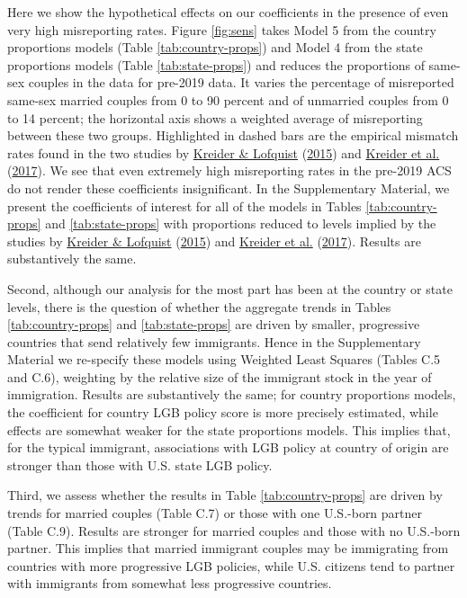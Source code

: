 \documentclass[
  12pt,
]{article}
\begin{document}
Here we show the hypothetical effects on our coefficients in the presence of even very high misreporting rates. Figure \ref{fig:sens} takes Model 5 from the country proportions models (Table \ref{tab:country-props}) and Model 4 from the state proportions models (Table \ref{tab:state-props}) and reduces the proportions of same-sex couples in the data for pre-2019 data. It varies the percentage of misreported same-sex married couples from 0 to 90 percent and of unmarried couples from 0 to 14 percent; the horizontal axis shows a weighted average of misreporting between these two groups. Highlighted in dashed bars are the empirical mismatch rates found in the two studies by \protect\hyperlink{ref-kreider_2015}{Kreider \& Lofquist} (\protect\hyperlink{ref-kreider_2015}{2015}) and \protect\hyperlink{ref-kreider_2017}{Kreider et al.} (\protect\hyperlink{ref-kreider_2017}{2017}). We see that even extremely high misreporting rates in the pre-2019 ACS do not render these coefficients insignificant. In the Supplementary Material, we present the coefficients of interest for all of the models in Tables \ref{tab:country-props} and \ref{tab:state-props} with proportions reduced to levels implied by the studies by \protect\hyperlink{ref-kreider_2015}{Kreider \& Lofquist} (\protect\hyperlink{ref-kreider_2015}{2015}) and \protect\hyperlink{ref-kreider_2017}{Kreider et al.} (\protect\hyperlink{ref-kreider_2017}{2017}). Results are substantively the same.

Second, although our analysis for the most part has been at the country or state levels, there is the question of whether the aggregate trends in Tables \ref{tab:country-props} and \ref{tab:state-props} are driven by smaller, progressive countries that send relatively few immigrants. Hence in the Supplementary Material we re-specify these models using Weighted Least Squares (Tables C.5 and C.6), weighting by the relative size of the immigrant stock in the year of immigration. Results are substantively the same; for country proportions models, the coefficient for country LGB policy score is more precisely estimated, while effects are somewhat weaker for the state proportions models. This implies that, for the typical immigrant, associations with LGB policy at country of origin are stronger than those with U.S. state LGB policy.

Third, we assess whether the results in Table \ref{tab:country-props} are driven by trends for married couples (Table C.7) or those with one U.S.-born partner (Table C.9). Results are stronger for married couples and those with no U.S.-born partner. This implies that married immigrant couples may be immigrating from countries with more progressive LGB policies, while U.S. citizens tend to partner with immigrants from somewhat less progressive countries.\\
\end{document}
